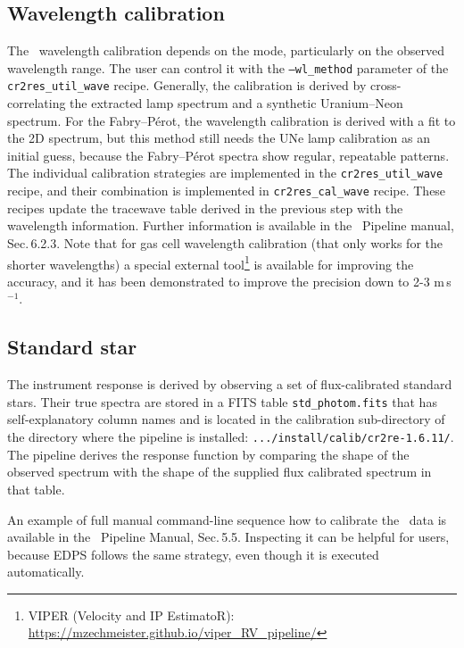 \subsection{Wavelength calibration}

The \instname\ wavelength calibration depends on the mode, particularly on the observed wavelength range. The user can control it with the {\tt ---wl\_method} parameter of the {\tt cr2res\_util\_wave} recipe. Generally, the calibration is derived by cross-
correlating the extracted lamp spectrum and a synthetic Uranium--Neon spectrum. For the Fabry--P\'erot, the wavelength calibration is derived with a fit to the 2D spectrum, but this method still needs the UNe lamp calibration as an initial guess, because the Fabry--P\'erot spectra show regular, repeatable patterns. The individual calibration strategies are implemented in the {\tt cr2res\_util\_wave} recipe, and their combination is implemented in {\tt cr2res\_cal\_wave} recipe. These recipes update the tracewave table derived in the previous step with the wavelength information. Further information is available in the \instname\ Pipeline manual, Sec.\,6.2.3.
Note that for gas cell wavelength calibration (that only works for the shorter wavelengths) a special external tool\footnote{VIPER (Velocity and IP EstimatoR): \url{https://mzechmeister.github.io/viper_RV_pipeline/}} is available for improving 
the accuracy, and it has been demonstrated to improve the precision down to 2-3 m\,s$^{-1}$.

\subsection{Standard star}

The instrument response is derived by observing a set of flux-calibrated standard stars. Their true spectra are stored in a FITS table {\tt std\_photom.fits} that has self-explanatory column names and is located in the calibration sub-directory of the directory where the pipeline is installed: {\tt .../install/calib/cr2re-1.6.11/}. The pipeline derives the response function by comparing the shape of the observed spectrum with the shape of the supplied flux calibrated spectrum in that table. 

An example of full manual command-line sequence how to calibrate the \instname\ data is available in the \instname\ Pipeline Manual, Sec.\,5.5. Inspecting it can be helpful for users, because EDPS follows the same strategy, even though it is executed automatically.


